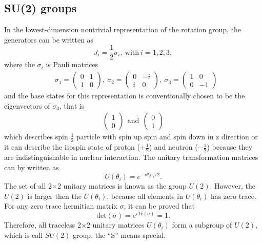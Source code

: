 \subsection{SU(2) groups}\label{subsec:SU2_groups}

In the lowest-dimension nontrivial representation of the rotation group, the generators can be written as
$$J_i=\frac{1}{2}\sigma_i,~\mathrm{with}~i=1,2,3,$$
where the $\sigma_i$ is Pauli matrices
\begin{equation}
\begin{split}
&\sigma_1=\begin{pmatrix} 0 & 1 \\ 1 & 0 \end{pmatrix},~\sigma_2=\begin{pmatrix} 0 & -i \\ i & 0 \end{pmatrix},~\sigma_3=\begin{pmatrix} 1 & 0 \\ 0 & -1 \end{pmatrix}
\end{split}
\label{eq:pauli_matrix}
\end{equation}
and the base states for this representation is conventionally chosen to be the eigenvectors of $\sigma_3$, that is 
\begin{equation}
\begin{split}
\begin{pmatrix}  1 \\  0 \end{pmatrix}~~\mathrm{and}~~\begin{pmatrix}  0 \\  1 \end{pmatrix}
\end{split}
\label{eq:base_state}
\end{equation}
which describes spin $\frac{1}{2}$ particle with spin up spin and spin down in z direction or it can describe the isospin state of proton ($+\frac{1}{2}$) and neutron ($-\frac{1}{2}$) because they are indistinguishable in nuclear interaction.
The unitary transformation matrices can by written as
$$U(\theta_i)=e^{-i\theta_i \sigma_i/2}.$$
The set of all 2$\times$2 unitary matrices is known as the group $U(2)$. However, the $U(2)$ is larger then the $U(\theta_i)$, because all elements in $U(\theta_i)$ has zero trace. For any zero trace hermitian matrix $\sigma$, it can be proved that 
$$\mathrm{det}(\sigma)=e^{iTr(\sigma)}=1.$$
Therefore, all traceless 2$\times$2 unitary matrices $U(\theta_i)$ form a subgroup of $U(2)$, which is call $SU(2)$ group, the ``S'' means special. 

